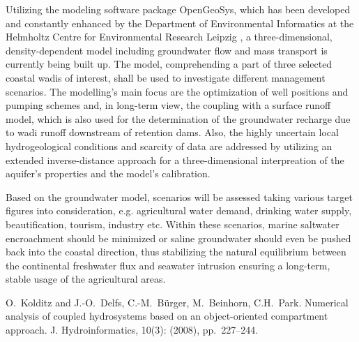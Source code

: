 Utilizing the modeling software package OpenGeoSys, which has been developed and constantly enhanced by the Department of Environmental Informatics at the Helmholtz Centre for Environmental Research Leipzig \cite{Kolditz_et_al_2008}, a three-dimensional, density-dependent model including groundwater flow and mass transport is currently being built up. The model, comprehending a part of three selected coastal wadis of interest, shall be used to investigate different management scenarios. The modelling's main focus are the optimization of well positions and pumping schemes and, in long-term view, the coupling with a surface runoff model, which is also used for the determination of the groundwater recharge due to wadi runoff downstream of retention dams. Also, the highly uncertain local hydrogeological conditions and scarcity of data are addressed by utilizing an extended inverse-distance approach for a three-dimensional interpreation of the aquifer's properties and the model's calibration. 

Based on the groundwater model, scenarios will be assessed taking various target figures into consideration, e.g. agricultural water demand, drinking water supply, beautification, tourism, industry etc. Within these scenarios, marine saltwater encroachment should be minimized or saline groundwater should even be pushed back into the coastal direction, thus stabilizing the natural equilibrium between the continental freshwater flux and seawater intrusion ensuring a long-term, stable usage of the agricultural areas.


\begin{thebibliography}{10}
{\sc O.~Kolditz and J.-O.~Delfs, C.-M.~B\"urger, M.~Beinhorn, C.H.~Park}. {Numerical analysis of coupled hydrosystems based on an object-oriented compartment approach}. J. Hydroinformatics, 10(3): (2008), pp.~227--244.
\end{thebibliography}
